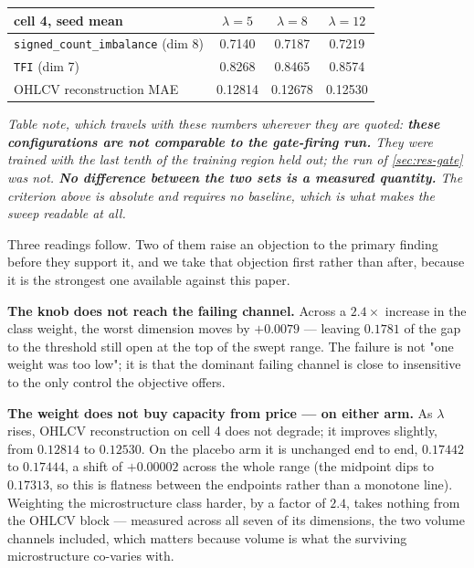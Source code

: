 \begin{center}\begin{minipage}{0.92\textwidth}
\centering
\begin{tabular}{lccc}
\toprule
cell 4, seed mean & $\lambda = 5$ & $\lambda = 8$ & $\lambda = 12$ \\
\midrule
\texttt{signed\_count\_imbalance} (dim 8) & 0.7140 & 0.7187 & 0.7219 \\
\texttt{TFI} (dim 7) & 0.8268 & 0.8465 & 0.8574 \\
OHLCV reconstruction MAE & 0.12814 & 0.12678 & 0.12530 \\
\bottomrule
\end{tabular}

\vspace{0.45em}
\emph{Table note, which travels with these numbers wherever they are quoted: \textbf{these
configurations are not comparable to the gate-firing run.} They were trained with the last tenth of
the training region held out; the run of \cref{sec:res-gate} was not. \textbf{No difference between
the two sets is a measured quantity.} The criterion above is absolute and requires no baseline,
which is what makes the sweep readable at all.}
\end{minipage}\end{center}

Three readings follow. Two of them raise an objection to the primary finding before they support
it, and we take that objection first rather than after, because it is the strongest one available
against this paper.

\textbf{The knob does not reach the failing channel.} Across a $2.4\times$ increase in the class
weight, the worst dimension moves by $+0.0079$ --- leaving $0.1781$ of the gap to the threshold
still open at the top of the swept range. The failure is not "one weight was too low"; it is that
the dominant failing channel is close to insensitive to the only control the objective offers.

\textbf{The weight does not buy capacity from price --- on either arm.} As $\lambda$ rises, OHLCV
reconstruction on cell 4 does not degrade; it improves slightly, from $0.12814$ to $0.12530$. On
the placebo arm it is unchanged end to end, $0.17442$ to $0.17444$, a shift of $+0.00002$ across
the whole range (the midpoint dips to $0.17313$, so this is flatness between the endpoints rather
than a monotone line). Weighting the microstructure class harder, by a factor of $2.4$, takes
nothing from the OHLCV block --- measured across all seven of its dimensions, the two volume
channels included, which matters because volume is what the surviving microstructure co-varies
with.

